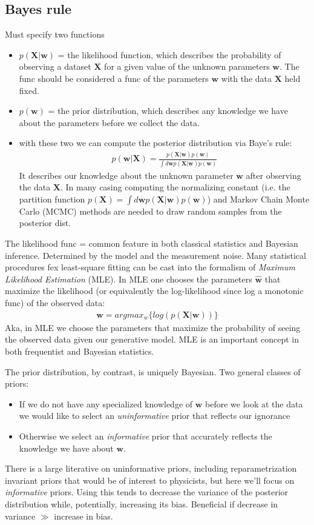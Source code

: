 \documentclass[norsk,a4paper,11pt]{article}
\begin{document}
\subsection{Bayes rule}
Must specify two functions
\begin{itemize}
	\item $p(\mathbf{X}|\mathbf{w})$ = the likelihood function, which describes the probability of observing a dataset $\mathbf{X}$ for a given value of the unknown parameters $\mathbf{w}$. The func should be considered a func of the parameters $\mathbf{w}$ with the data $\mathbf{X}$ held fixed.
	\item $p(\mathbf{w})$ = the prior distribution, which describes any knowledge we have about the parameters before we collect the data.
	\item with these two we can compute the posterior distribution via Baye's rule:
	\begin{align}
		p(\mathbf{w}|\mathbf{X}) = \frac{p(\mathbf{X}|\mathbf{w})p(\mathbf{w})}{\int d\mathbf{w} p(\mathbf{X}|\mathbf{w})p(\mathbf{w})}
	\end{align}
	It describes our knowledge about the unknown parameter $\mathbf{w}$ after observing the data $\mathbf{X}$. In many casing computing the normalizing constant (i.e. the partition function $p(\mathbf{X}) = \int d\mathbf{w} p(\mathbf{X}|\mathbf{w})p(\mathbf{w})$) and Markov Chain Monte Carlo (MCMC) methods are needed to draw random samples from the posterior dist.
\end{itemize}
The likelihood func = common feature in both classical statistics and Bayesian inference. Determined by the model and the measurement noise. Many statistical procedures fex least-square fitting can be cast into the formalism of \textit{Maximum Likelihood Estimation} (MLE). In MLE one chooses the parameters $\hat{\mathbf{w}}$ that maximize the likelihood (or equivalently the log-likelihood since log a monotonic func) of the observed data:
\begin{align}
	\hat{\mathbf{w}} = argmax_w \{log(p(\mathbf{X}|\mathbf{w})) \}
\end{align}
Aka, in MLE we choose the parameters that maximize the probability of seeing the observed data given our generative model. MLE is an important concept in both frequentist and Bayesian statistics.

The prior distribution, by contrast, is uniquely Bayesian. Two general classes of priors:
\begin{itemize}
	\item If we do not have any specialized knowledge of $\mathbf{w}$ before we look at the data we would like to select an \textit{uninformative} prior that reflects our ignorance
	\item Otherwise we select an \textit{informative} prior that accurately reflects the knowledge we have about $\mathbf{w}$.
\end{itemize}
There is a large literative on uninformative priors, including reparametrization invariant priors that would be of interest to physicists, but here we'll focus on \textit{informative} priors. Using this tends to decrease the variance of the posterior distribution while, potentially, increasing its bias. Beneficial if decrease in variance $\gg$ increase in bias.
\end{document}
